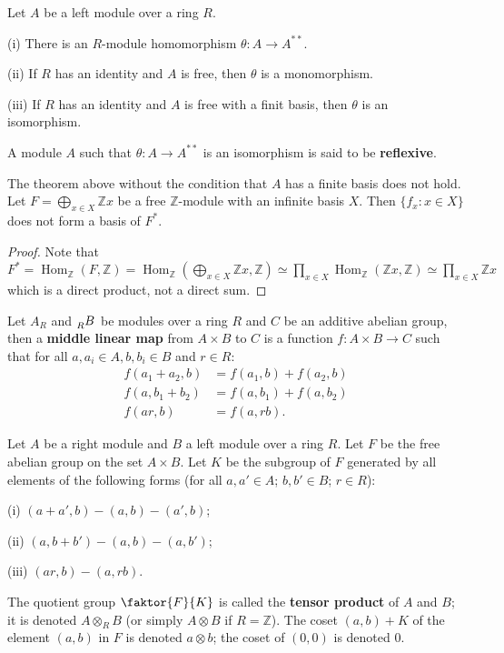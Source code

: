 \documentclass{article}
\DeclareMathOperator{\Hom}{Hom}
\begin{document}
\begin{theorem}
    Let $A$ be a left module over a ring $R$.

    (i) There is an $R$-module homomorphism $\theta:A\to A^{**}$.

    (ii) If $R$ has an identity and $A$ is free, then $\theta$ is a monomorphism.

    (iii) If $R$ has an identity and $A$ is free with a finit basis, then $\theta$ is an isomorphism.
\end{theorem}
A module $A$ such that $\theta:A \to A^{**}$ is an isomorphism is said to be \textbf{reflexive}.
\begin{example}
    The theorem above without the condition that $A$ has a finite basis does not hold. Let $F=\bigoplus_{x \in X}\mathbb{Z}x$ be a free $\mathbb{Z}$-module with an infinite basis $X$. Then $\{f_x:x \in X\}$ does not form a basis of $F^*$.
\end{example}
\begin{proof}
    Note that $F^*=\Hom_{\mathbb{Z}}(F, \mathbb{Z})=\Hom_{\mathbb{Z}}(\bigoplus_{x \in X} \mathbb{Z}x, \mathbb{Z}) \simeq \prod_{x \in X}\Hom_{\mathbb{Z}}(\mathbb{Z}x, \mathbb{Z}) \simeq \prod_{x \in X} \mathbb{Z}x  $ which is a direct product, not a direct sum.
\end{proof}

\begin{definition}
    Let $A_R$ and $\tensor[_R]{B}{}$ be modules over a ring $R$ and $C$ be an additive abelian group, then a \textbf{middle linear map} from $A\times B$ to $C$ is a function $f:A\times B\to C$ such that for all $a,a_{i}\in A,b,b_{i}\in B$ and $r \in R$:
    \begin{equation*}
        \begin{aligned}
        f(a_{1}+a_{2},b) &=f(a_{1},b) + f(a_{2}, b) \\
        f(a,b_{1}+b_{2}) &=f(a,b_{1}) + f(a,b_{2}) \\
        f(ar,b) &= f(a,rb).
        \end{aligned}
    \end{equation*}
\end{definition}

\begin{definition}
    Let $A$ be a right module and $B$ a left module over a ring $R$. Let $F$ be the free abelian group on the set $A\times B$. Let $K$ be the subgroup of $F$ generated by all elements of the following forms (for all $a,a' \in A$; $b,b' \in B$; $r \in R$):

    (i) $(a+a',b)-(a,b)-(a',b)$;

    (ii) $(a,b+b')-(a,b)-(a,b')$;

    (iii) $(ar,b)-(a,rb)$.

    The quotient group $\faktor{F}{K}$ is called the \textbf{tensor product} of $A$ and $B$; it is denoted $A\otimes_R B$ (or simply $A\otimes B$ if $R=\mathbb{Z}$). The coset $(a,b)+K$ of the element $(a,b)$ in $F$ is denoted $a\otimes b$; the coset of $(0,0)$ is denoted $0$.
\end{definition}
\end{document}

